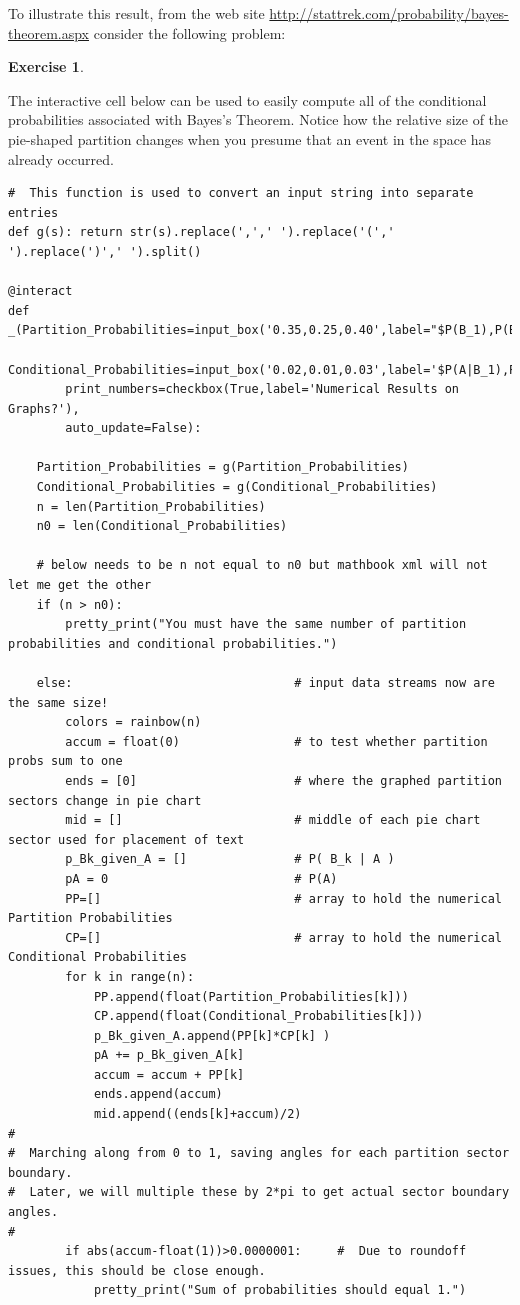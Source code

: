 \documentclass[10pt,]{book}
\theoremstyle{plain}
\theoremstyle{definition}
\theoremstyle{definition}
\theoremstyle{definition}
\newtheorem{exercise}[theorem]{Exercise}
\numberwithin{equation}{section}
\begin{document}
	To illustrate this result, from the web site \url{http://stattrek.com/probability/bayes-theorem.aspx} consider the following problem:
\begin{exercise}\label{exercise-1}
\end{exercise}
\par
The interactive cell below can be used to easily compute all of the conditional probabilities associated with Bayes's Theorem. Notice how the relative size of the pie-shaped partition changes when you presume that an event in the space has already occurred.%
\begin{lstlisting}[style=sageinput]
#  This function is used to convert an input string into separate entries
def g(s): return str(s).replace(',',' ').replace('(',' ').replace(')',' ').split()

@interact
def _(Partition_Probabilities=input_box('0.35,0.25,0.40',label="$P(B_1),P(B_2),...$"),
        Conditional_Probabilities=input_box('0.02,0.01,0.03',label='$P(A|B_1),P(A|B_2),...$'),
        print_numbers=checkbox(True,label='Numerical Results on Graphs?'),
        auto_update=False):
            
    Partition_Probabilities = g(Partition_Probabilities)
    Conditional_Probabilities = g(Conditional_Probabilities)
    n = len(Partition_Probabilities)
    n0 = len(Conditional_Probabilities)
    
    # below needs to be n not equal to n0 but mathbook xml will not let me get the other
    if (n > n0):
        pretty_print("You must have the same number of partition probabilities and conditional probabilities.")
        
    else:                               # input data streams now are the same size!
        colors = rainbow(n)
        accum = float(0)                # to test whether partition probs sum to one
        ends = [0]                      # where the graphed partition sectors change in pie chart 
        mid = []                        # middle of each pie chart sector used for placement of text
        p_Bk_given_A = []               # P( B_k | A )
        pA = 0                          # P(A)
        PP=[]                           # array to hold the numerical Partition Probabilities 
        CP=[]                           # array to hold the numerical Conditional Probabilities     
        for k in range(n):
            PP.append(float(Partition_Probabilities[k]))
            CP.append(float(Conditional_Probabilities[k]))    
            p_Bk_given_A.append(PP[k]*CP[k] )
            pA += p_Bk_given_A[k]
            accum = accum + PP[k]
            ends.append(accum)
            mid.append((ends[k]+accum)/2)
#
#  Marching along from 0 to 1, saving angles for each partition sector boundary.
#  Later, we will multiple these by 2*pi to get actual sector boundary angles.
#
        if abs(accum-float(1))>0.0000001:     #  Due to roundoff issues, this should be close enough.                     
            pretty_print("Sum of probabilities should equal 1.")
        

\end{lstlisting}
\end{document}

